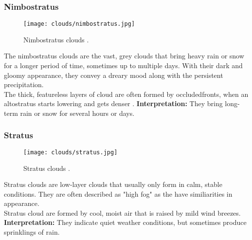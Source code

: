 \subsubsection{Nimbostratus}
\begin{wrapfigure}[10]{r}{6.3cm}
    \vspace{-\baselineskip}
    \texttt{[image: clouds/nimbostratus.jpg]}
    \caption{Nimbostratus clouds \protect\cite{cloudtypes:meteoblue}.}
    \label{img:clouds:nimbostratus}
\end{wrapfigure}
The nimbostratus clouds are the vast, grey clouds that bring heavy rain or snow for a longer period of time, sometimes up to multiple days.
With their dark and gloomy appearance, they convey a dreary mood along with the persistent \gls{precipitation}.
\\
The thick, featureless layers of cloud are often formed by \gls{occludedfront}s, when an altostratus starts lowering and gets denser \cite{cloudtypes:wiki:nimbostratus}.
\emptyline
\textbf{Interpretation:}
They bring long-term rain or snow for several hours or days.

\pagebreak

\subsubsection{Stratus}
\begin{wrapfigure}[9]{r}{6.3cm}
    \vspace{-\baselineskip}
    \texttt{[image: clouds/stratus.jpg]}
    \caption{Stratus clouds \protect\cite{cloudtypes:meteoblue}.}
    \label{img:clouds:stratus}
\end{wrapfigure}
Stratus clouds are low-layer clouds that usually only form in calm, stable conditions.
They are often described as "high fog" as the have similiarities in appearance.
\\
Stratus cloud are formed by cool, moist air that is raised by mild wind breezes.
\emptyline
\textbf{Interpretation:}
They indicate quiet weather conditions, but sometimes produce sprinklings of rain.


